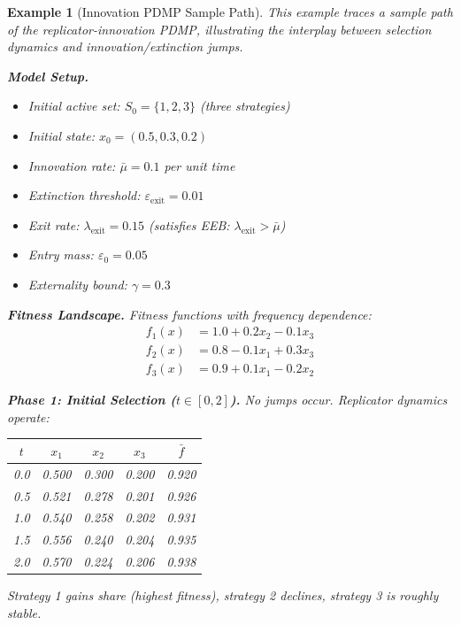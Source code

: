 \documentclass[12pt]{article}
\newtheorem{example}[theorem]{Example}
\begin{document}
\begin{example}[Innovation PDMP Sample Path]
\label{ex:pdmp-sample}
This example traces a sample path of the replicator-innovation PDMP, illustrating the interplay between selection dynamics and innovation/extinction jumps.

\textbf{Model Setup.}
\begin{itemize}
    \item Initial active set: $S_0 = \{1, 2, 3\}$ (three strategies)
    \item Initial state: $x_0 = (0.5, 0.3, 0.2)$
    \item Innovation rate: $\bar{\mu} = 0.1$ per unit time
    \item Extinction threshold: $\varepsilon_{\text{exit}} = 0.01$
    \item Exit rate: $\lambda_{\text{exit}} = 0.15$ (satisfies EEB: $\lambda_{\text{exit}} > \bar{\mu}$)
    \item Entry mass: $\varepsilon_0 = 0.05$
    \item Externality bound: $\gamma = 0.3$
\end{itemize}

\textbf{Fitness Landscape.}
Fitness functions with frequency dependence:
\begin{align*}
f_1(x) &= 1.0 + 0.2x_2 - 0.1x_3 \\
f_2(x) &= 0.8 - 0.1x_1 + 0.3x_3 \\
f_3(x) &= 0.9 + 0.1x_1 - 0.2x_2
\end{align*}

\textbf{Phase 1: Initial Selection ($t \in [0, 2]$).}
No jumps occur. Replicator dynamics operate:

\begin{center}
\begin{tabular}{c|ccc|c}
$t$ & $x_1$ & $x_2$ & $x_3$ & $\bar{f}$ \\
\hline
0.0 & 0.500 & 0.300 & 0.200 & 0.920 \\
0.5 & 0.521 & 0.278 & 0.201 & 0.926 \\
1.0 & 0.540 & 0.258 & 0.202 & 0.931 \\
1.5 & 0.556 & 0.240 & 0.204 & 0.935 \\
2.0 & 0.570 & 0.224 & 0.206 & 0.938 \\
\end{tabular}
\end{center}

Strategy 1 gains share (highest fitness), strategy 2 declines, strategy 3 is roughly stable.


\end{example}
\end{document}
